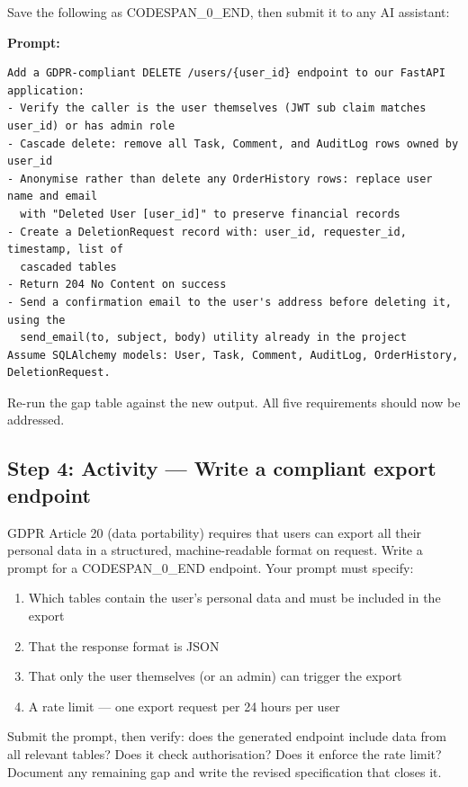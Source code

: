 \documentclass[11pt,a4paper]{book}
\begin{document}
Save the following as CODESPAN\_0\_END, then submit it to any AI assistant:

\textbf{Prompt:}
\begin{lstlisting}
Add a GDPR-compliant DELETE /users/{user_id} endpoint to our FastAPI application:
- Verify the caller is the user themselves (JWT sub claim matches user_id) or has admin role
- Cascade delete: remove all Task, Comment, and AuditLog rows owned by user_id
- Anonymise rather than delete any OrderHistory rows: replace user name and email
  with "Deleted User [user_id]" to preserve financial records
- Create a DeletionRequest record with: user_id, requester_id, timestamp, list of
  cascaded tables
- Return 204 No Content on success
- Send a confirmation email to the user's address before deleting it, using the
  send_email(to, subject, body) utility already in the project
Assume SQLAlchemy models: User, Task, Comment, AuditLog, OrderHistory, DeletionRequest.
\end{lstlisting}

Re-run the gap table against the new output. All five requirements should now be addressed.

\subsection{Step 4: Activity --- Write a compliant export endpoint}

GDPR Article 20 (data portability) requires that users can export all their personal data in a structured, machine-readable format on request. Write a prompt for a CODESPAN\_0\_END endpoint. Your prompt must specify:

\begin{enumerate}
  \item Which tables contain the user's personal data and must be included in the export
  \item That the response format is JSON
  \item That only the user themselves (or an admin) can trigger the export
  \item A rate limit --- one export request per 24 hours per user
\end{enumerate}

Submit the prompt, then verify: does the generated endpoint include data from all relevant tables? Does it check authorisation? Does it enforce the rate limit? Document any remaining gap and write the revised specification that closes it.

\medskip
\end{document}

